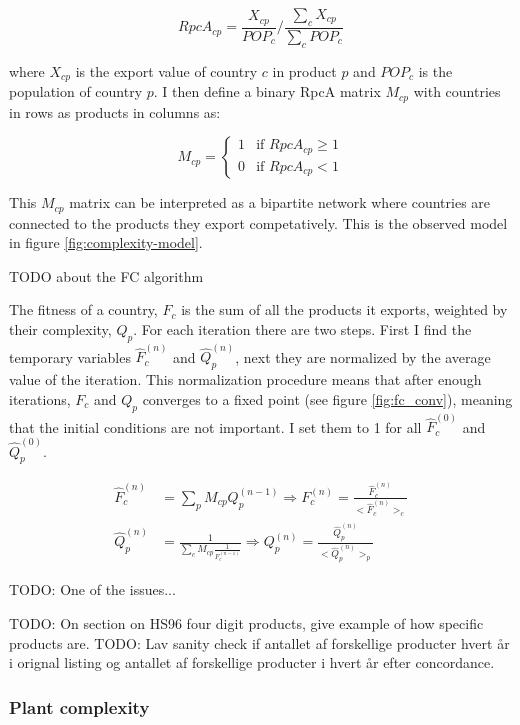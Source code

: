 \documentclass[11pt]{article}
\begin{document}
\[
	RpcA_{cp} = \frac{X_{cp}}{POP_{c}} \bigg / \frac{\sum_c X_{cp}}{\sum_c POP_c}
\]

where \(X_{cp}\) is the export value of country \(c\) in product \(p\) and \(POP_{c}\) is the population of country \(p\). I then define a binary RpcA matrix \(M_{cp}\) with countries in rows as products in columns as:

\[
M_{cp} = \begin{cases}
 1 & \text{if } RpcA_{cp} \geq 1 \\
 0 & \text{if } RpcA_{cp} < 1
\end{cases}
\]

This \(M_{cp}\) matrix can be interpreted as a bipartite network where countries are connected to the products they export competatively. This is the observed model in figure \ref{fig:complexity-model}. 

TODO about the FC algorithm 

The fitness of a country, \(F_{c}\) is the sum of all the products it exports, weighted by their complexity, \(Q_{p}\). For each iteration there are two steps. First I find the temporary variables \(\hat{F}^{(n)}_{c}\) and \(\hat{Q}^{(n)}_{p}\), next they are normalized by the average value of the iteration. This normalization procedure means that after enough iterations, \(F_{c}\) and \(Q_{p}\) converges to a fixed point (see figure \ref{fig:fc_conv}), meaning that the initial conditions are not important. I set them to 1 for all \(\hat{F}^{(0)}_{c}\) and \(\hat{Q}^{(0)}_{p}\).

 \[
	 \begin{split}
		 \hat{F}^{(n)}_{c} &= \sum_p M_{cp} Q^{(n-1)}_{p} \Rightarrow F^{(n)}_{c} = \frac{\hat{F}^{(n)}_{c}}{\bigg < \hat{F}^{(n)}_c \bigg > _c} \\
		 \hat{Q}^{(n)}_{p} &= \frac{1}{\sum_c M_{cp} \frac{1}{F^{(n-1)}_c}} \Rightarrow Q^{(n)}_{p} = \frac{\hat{Q}^{(n)}_{p}}{\bigg < \hat{Q}^{(n)}_p \bigg > _p }
	 \end{split}
\]

TODO: One of the issues...

TODO: On section on HS96 four digit products, give example of how specific products are.
TODO: Lav sanity check if antallet af forskellige producter hvert år i orignal listing og antallet af forskellige producter i hvert år efter concordance.

\subsubsection{Plant complexity}%
\label{sub:plant_complexity}
\end{document}
